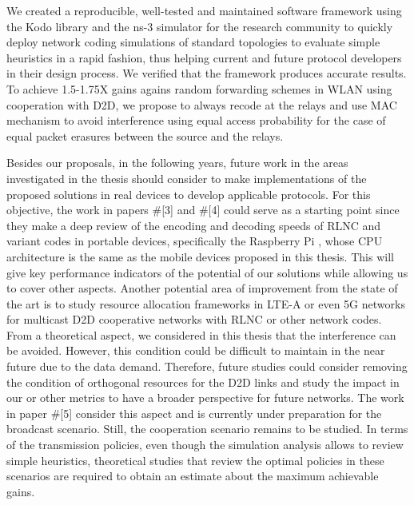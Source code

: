 We created a reproducible, well-tested and maintained software framework using the Kodo library and the ns-3 simulator for the research community to quickly deploy network coding simulations of standard topologies to evaluate simple heuristics in a rapid fashion, thus helping current and future protocol developers in their design process. We verified that the framework produces accurate results. To achieve 1.5-1.75X gains agains random forwarding schemes in \ac{WLAN} using cooperation with \ac{D2D}, we propose to always recode at the relays and use \ac{MAC} mechanism to avoid interference using equal access probability for the case of equal packet erasures between the source and the relays.

Besides our proposals, in the following years, future work in the areas investigated in the thesis should consider to make implementations of the proposed solutions in real devices to develop applicable protocols. For this objective, the work in papers \#[3] and \#[4] could serve as a starting point since they make a deep review of the encoding and decoding speeds of \ac{RLNC} and variant codes in portable devices, specifically the Raspberry Pi \cite{raspberrypi}, whose \ac{CPU} architecture is the same as the mobile devices proposed in this thesis. This will give key performance indicators of the potential of our solutions while allowing us to cover other aspects. Another potential area of improvement from the state of the art is to study resource allocation frameworks in \ac{LTE-A} or even 5G networks for multicast \ac{D2D} cooperative networks with \ac{RLNC} or other network codes. From a theoretical aspect, we considered in this thesis that the interference can be avoided. However, this condition could be difficult to maintain in the near future due to the data demand. Therefore, future studies could consider removing the condition of orthogonal resources for the \ac{D2D} links and study the impact in our or other metrics to have a broader perspective for future networks. The work in paper \#[5] consider this aspect and is currently under preparation for the broadcast scenario. Still, the cooperation scenario remains to be studied. In terms of the transmission policies, even though the simulation analysis allows to review simple heuristics, theoretical studies that review the optimal policies in these scenarios are required to obtain an estimate about the maximum achievable gains.

\clearpage
